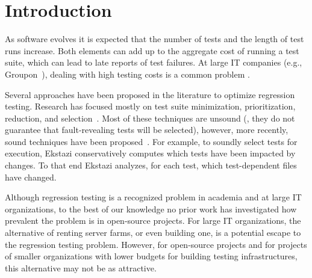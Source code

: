 \section{Introduction}


As software evolves it is expected that the number of tests and the
length of test runs increase.  Both elements can add up to the
aggregate cost of running a test suite, which can lead to late reports of test
failures.  At large IT companies (e.g.,
Groupon~\cite{kim-etal-fse2013}), dealing with high testing costs is a
common problem .  

Several approaches have been proposed in the literature to optimize
regression testing.  Research has focused mostly on test suite
minimization, prioritization, reduction, and
selection~\cite{yoo-harman-stvr2012}.  Most of these techniques are
unsound (\ie{}, they do not guarantee that fault-revealing tests will
be selected), however, more recently, sound techniques have been
proposed~\cite{gligoric-etal-issta2015,soetens-etal-2016}.  For
example, to soundly select tests for execution,
Ekstazi\cite{ekstazi-web,gligoric-etal-issta2015} conservatively
computes which tests have been impacted by changes.  To that end
Ekstazi analyzes, for each test, which test-dependent files have
changed.


Although regression testing is a recognized problem in academia and at
large IT organizations, to the best of our knowledge no prior work has
investigated how prevalent the problem is in open-source projects.
For large IT organizations, the alternative of renting server farms,
or even building one, is a potential escape to the regression testing
problem.  However, for open-source projects and for projects of
smaller organizations with lower budgets for building testing
infrastructures, this alternative may not be as attractive.

\newcommand{\numSubjs}{143}

